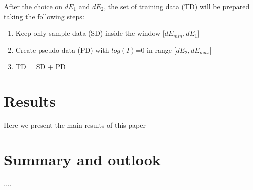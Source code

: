 \documentclass[11pt,a4paper]{article}
\numberwithin{equation}{section}
\numberwithin{figure}{section}
\numberwithin{table}{section}
\begin{document}
After the choice on $dE_1$ and $dE_2$, the set of training data (TD) will be prepared taking the following steps:
\begin{enumerate}
    \item Keep only sample data (SD) inside the window [$dE_{min}, dE_1$]
    \item Create pseudo data (PD) with $log(I)$=0 in range [$dE_2, dE_{max}$]
    \item TD = SD + PD
\end{enumerate}

\section{Results}
Here we present the main results of this paper

\section{Summary and outlook}
....


\end{document}
